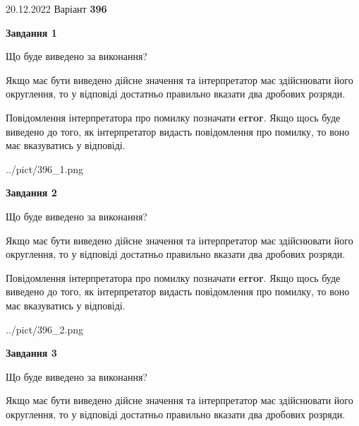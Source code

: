 \documentclass[12pt, ukrainian]{article}
\begin{document}
{20.12.2022 Варіант \No \textbf { 396 }\par}
{
\begin {Large}

{\begin {center}\textbf{Завдання 1}\end {center}}\par
Що буде виведено за виконання? \par

Якщо має бути виведено дійсне значення та інтерпретатор має здійснювати його округлення, 
то у відповіді достатньо правильно вказати два дробових розряди.

Повідомлення інтерпретатора про помилку позначати \textbf{error}.
Якщо щось буде виведено до того, як інтерпретатор видасть повідомлення про помилку, 
то воно має вказуватись у відповіді. \par

\begin{center}
	{../pict/396_1.png}
\end{center}
\newpage

{\begin {center}\textbf{Завдання 2}\end {center}}\par
Що буде виведено за виконання? \par

Якщо має бути виведено дійсне значення та інтерпретатор має здійснювати його округлення, 
то у відповіді достатньо правильно вказати два дробових розряди.

Повідомлення інтерпретатора про помилку позначати \textbf{error}.
Якщо щось буде виведено до того, як інтерпретатор видасть повідомлення про помилку, 
то воно має вказуватись у відповіді. \par

\begin{center}
	{../pict/396_2.png}
\end{center}
\newpage

{\begin {center}\textbf{Завдання 3}\end {center}}\par
Що буде виведено за виконання? \par

Якщо має бути виведено дійсне значення та інтерпретатор має здійснювати його округлення, 
то у відповіді достатньо правильно вказати два дробових розряди.


\end{Large}}
\end{document}
